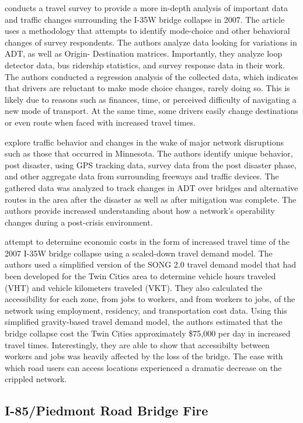 \citet{zhu2010} conducts a travel survey to provide a more in-depth
analysis of important data
and traffic changes surrounding the I-35W bridge collapse in 2007. The
article uses a methodology
that attempts to identify mode-choice and other behavioral changes of
survey respondents. The
authors analyze data looking for variations in ADT, as well as Origin-
Destination matrices.
Importantly, they analyze loop detector data, bus ridership statistics, and survey response data in their work. The
authors conducted a regression analysis of the collected data,
which indicates that drivers are reluctant to make mode choice changes,
rarely doing so. This is
likely due to reasons such as finances, time, or perceived difficulty of
navigating a new mode of
transport. At the same time, some drivers easily change destinations or even route when faced
with increased travel
times.

\citet{levinson2010} explore traffic behavior and changes in the wake of
major network
disruptions such as those that occurred in Minnesota. The authors identify
unique behavior, post
disaster, using GPS tracking data, survey data from the post disaster
phase, and other aggregate
data from surrounding freeways and traffic devices. The gathered data was
analyzed to track
changes in ADT over bridges and alternative routes in the area after the
disaster as well as
after mitigation was complete. The authors provide increased
understanding about how a
network's operability changes during a post-crisis environment.

\citet{xie2011} attempt to determine economic costs in the form of
increased travel time
of the 2007 I-35W bridge collapse using a scaled-down travel demand model.
The authors used a
simplified version of the SONG 2.0 travel demand model that had been
developed for the Twin
Cities area to determine vehicle hours traveled (VHT) and vehicle
kilometers traveled (VKT). They
also calculated the accessibility for each zone, from jobs to workers, and
from workers to jobs, of
the network using employment, residency, and transportation cost data.
Using this simplified
gravity-based travel demand model, the authors estimated that the bridge collapse cost the Twin
Cities approximately
\$75,000 per day in increased travel times. Interestingly, they are able to show that accessibilty between workers and jobs was heavily affected by the loss of the bridge. The ease with which road users can access locations experienced a dramatic decrease on the crippled network.

\subsection{I-85/Piedmont Road Bridge Fire}

